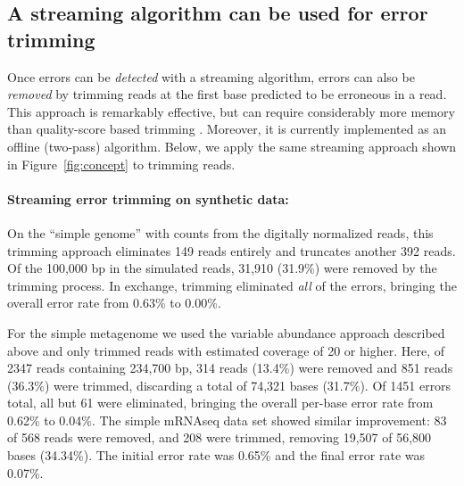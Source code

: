 \documentclass{article}
\begin{document}
\subsection{A streaming algorithm can be used for error trimming}

Once errors can be {\em detected} with a streaming algorithm, errors
can also be {\em removed} by trimming reads at the first base
predicted to be erroneous in a read.  This approach is remarkably
effective, but can require considerably more memory than quality-score
based trimming \cite{Zhang2014}.  Moreover, it is currently
implemented as an offline (two-pass) algorithm.  Below, we apply the same
streaming approach shown in Figure~\ref{fig:concept} to trimming
reads.



\paragraph{Streaming error trimming on synthetic data:}

On the ``simple genome'' with counts from the digitally normalized
reads, this trimming approach eliminates 149 reads entirely and
truncates another 392 reads.  Of the 100,000 bp in the simulated
reads, 31,910 (31.9\%) were removed by the trimming process.  In
exchange, trimming eliminated {\em all} of the errors, bringing the
overall error rate from 0.63\% to 0.00\%.


For the simple metagenome we used the variable abundance approach
described above and only trimmed reads with estimated coverage of 20
or higher.  Here, of 2347 reads containing 234,700 bp, 314 reads
(13.4\%) were removed and 851 reads (36.3\%) were trimmed, discarding
a total of 74,321 bases (31.7\%).  Of 1451 errors total, all but 61
were eliminated, bringing the overall per-base error rate from 0.62\% to
0.04\%.  The simple mRNAseq data set showed similar improvement: 83 of
568 reads were removed, and 208 were trimmed, removing 19,507 of
56,800 bases (34.34\%).  The initial error rate was 0.65\% and the
final error rate was 0.07\%.

\end{document}

